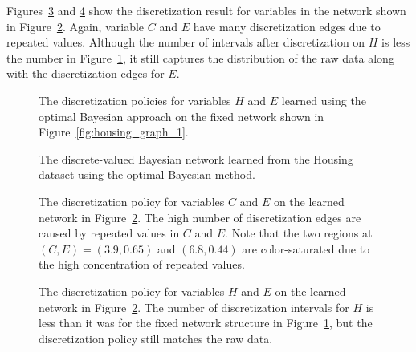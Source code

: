 Figures~\ref{fig:housing_exp2_distr_3_5} and \ref{fig:housing_exp2_distr_8_5} show the discretization result for variables in the network shown in Figure~\ref{fig:housing_graph_2}.
Again, variable $C$ and $E$ have many discretization edges due to repeated values.
Although the number of intervals after discretization on $H$ is less the number in Figure~\ref{fig:housing_exp1_distr_8_5}, it still captures the distribution of the raw data along with the discretization edges for $E$.

\begin{figure}[H]
  \centering
  
  \caption{
    The discretization policies for variables $H$ and $E$ learned using the optimal Bayesian approach on the fixed network shown in Figure~\ref{fig:housing_graph_1}.
  }
  \label{fig:housing_exp1_distr_8_5}
\end{figure}

\begin{figure}[H]
  \centering
  \scalebox{0.8}{}
  \caption{
    The discrete-valued Bayesian network learned from the Housing dataset using the optimal Bayesian method.
  }
  \label{fig:housing_graph_2}
\end{figure}

\begin{figure}[H]
  \centering
  
  \caption{
    The discretization policy for variables $C$ and $E$ on the learned network in Figure~\ref{fig:housing_graph_2}.
    The high number of discretization edges are caused by repeated values in $C$ and $E$.
    Note that the two regions at $(C,E) = (3.9,0.65)$ and $(6.8,0.44)$ are color-saturated due to the high concentration of repeated values.
  }
  \label{fig:housing_exp2_distr_3_5}
\end{figure}

\begin{figure}[H]
  \centering
  
  \caption{
    The discretization policy for variables $H$ and $E$ on the learned network in Figure~\ref{fig:housing_graph_2}.
    The number of discretization intervals for $H$ is less than it was for the fixed network structure in Figure~\ref{fig:housing_exp1_distr_8_5}, but the discretization policy still matches the raw data.
  }
  \label{fig:housing_exp2_distr_8_5}
\end{figure}

